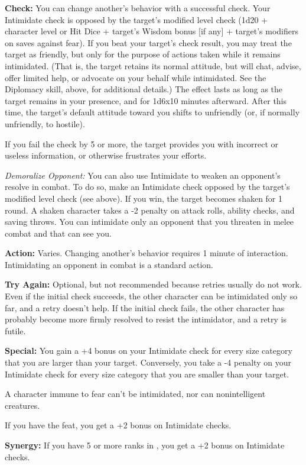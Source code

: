 
\textbf{Check:} You can change another's behavior with a successful check. Your 
Intimidate check is opposed by the target's modified level check (1d20 + character 
level or Hit Dice + target's Wisdom bonus [if any] + target's modifiers on saves 
against fear). If you beat your target's check result, you may treat the target 
as friendly, but only for the purpose of actions taken while it remains intimidated. 
(That is, the target retains its normal attitude, but will chat, advise, offer 
limited help, or advocate on your behalf while intimidated. See the Diplomacy skill, 
above, for additional details.) The effect lasts as long as the target remains 
in your presence, and for 1d6x10 minutes afterward. After this 
time, the target's default attitude toward you shifts to unfriendly (or, if normally 
unfriendly, to hostile).

If you fail the check by 5 or more, the target provides you with incorrect or useless 
information, or otherwise frustrates your efforts.

\textit{Demoralize Opponent:} You can also use Intimidate to weaken an opponent's 
resolve in combat. To do so, make an Intimidate check opposed by the target's modified 
level check (see above). If you win, the target becomes shaken for 1 round. A shaken 
character takes a -2 penalty on attack rolls, ability checks, and saving throws. 
You can intimidate only an opponent that you threaten in melee combat and that 
can see you.

\textbf{Action:} Varies. Changing another's behavior requires 1 minute of interaction. 
Intimidating an opponent in combat is a standard action.

\textbf{Try Again:} Optional, but not recommended because retries usually do not 
work. Even if the initial check succeeds, the other character can be intimidated 
only so far, and a retry doesn't help. If the initial check fails, the other character 
has probably become more firmly resolved to resist the intimidator, and a retry 
is futile.

\textbf{Special:} You gain a +4 bonus on your Intimidate check for every size category 
that you are larger than your target. Conversely, you take a -4 penalty on your 
Intimidate check for every size category that you are smaller than your target.

A character immune to fear can't be intimidated, nor can nonintelligent creatures.

If you have the  feat, you get a +2 bonus on Intimidate checks.

\textbf{Synergy:} If you have 5 or more ranks in , you get a +2 bonus on Intimidate 
checks.
